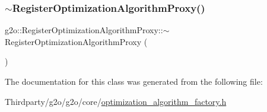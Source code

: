 \mbox{\label{classg2o_1_1_register_optimization_algorithm_proxy_a30f84a170a0d140ee60e1bc428d4c65f}} 
\subsubsection{\texorpdfstring{$\sim$\+Register\+Optimization\+Algorithm\+Proxy()}{~RegisterOptimizationAlgorithmProxy()}}
{\footnotesize\ttfamily g2o\+::\+Register\+Optimization\+Algorithm\+Proxy\+::$\sim$\+Register\+Optimization\+Algorithm\+Proxy (\begin{DoxyParamCaption}{ }\end{DoxyParamCaption})\hspace{0.3cm}{\ttfamily [inline]}}



The documentation for this class was generated from the following file\+:\begin{DoxyCompactItemize}
\item 
Thirdparty/g2o/g2o/core/\mbox{\hyperlink{optimization__algorithm__factory_8h}{optimization\+\_\+algorithm\+\_\+factory.\+h}}\end{DoxyCompactItemize}
